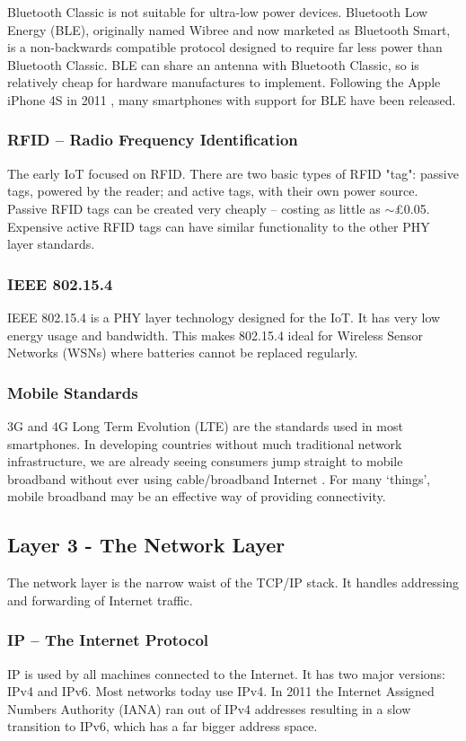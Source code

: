 \documentclass[10pt,journal,compsoc]{IEEEtran}
\begin{document}
Bluetooth Classic is not suitable for ultra-low power devices. Bluetooth Low
Energy (BLE), originally named Wibree and now marketed as Bluetooth Smart, is a
non-backwards compatible protocol designed to require far less power than
Bluetooth Classic. BLE can share an antenna with Bluetooth Classic, so is
relatively cheap for hardware manufactures to implement. Following the Apple
iPhone 4S in 2011 \cite{Engadget2011}, many smartphones with support for BLE
have been released.

\subsubsection{RFID -- Radio Frequency Identification}
The early IoT focused on RFID. There are two basic types of RFID "tag": passive
tags, powered by the reader; and active tags, with their own power source.
Passive RFID tags can be created very cheaply -- costing as little as
$\sim$\pounds0.05. Expensive active RFID tags can have similar functionality
to the other PHY layer standards. 

\subsubsection{IEEE 802.15.4}
IEEE 802.15.4 is a PHY layer technology designed for the IoT. It has very low
energy usage and bandwidth. This makes 802.15.4 ideal for Wireless Sensor
Networks (WSNs) where batteries cannot be replaced regularly. 

\subsubsection{Mobile Standards}
3G and 4G Long Term Evolution (LTE) are the standards used in most smartphones.
In developing countries without much traditional network infrastructure, we are
already seeing consumers jump straight to mobile broadband without ever using
cable/broadband Internet \cite{Kritzinger2013}. For many `things', mobile
broadband may be an effective way of providing connectivity.  

\subsection{Layer 3 - The Network Layer}
The network layer is the narrow waist of the TCP/IP stack. It handles
addressing and forwarding of Internet traffic. 

\subsubsection{IP -- The Internet Protocol}
IP is used by all machines connected to the Internet. It has two major
versions: IPv4 and IPv6. Most networks today use IPv4. In 2011 the Internet
Assigned Numbers Authority (IANA) ran out of IPv4 addresses \cite{Potaroo}
resulting in a slow transition to IPv6, which has a far bigger address space.
\end{document}
